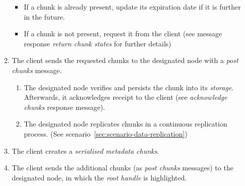 \begin{enumerate}
\begin{enumerate}
                \begin{itemize}
                    \item If a chunk is already present, update its expiration date if it is further in the future.
                    \item If a chunk is not present, request it from the client (see message response \emph{return chunk states} for further details)
                \end{itemize}
            \item The client sends the requested chunks to the designated node with a \emph{post chunks} message. %
                \begin{enumerate}
                    \item The designated node verifies and persists the chunk into its \emph{storage}. Afterwards, it acknowledges receipt to the client (see \emph{acknowledge chunks} response message).
                    \item The designated node replicates chunks in a continuous replication process. (See scenario~\ref{sec:scenario-data-replication})
                \end{enumerate}
            \item The client creates a \emph{serialised metadata chunks}. %
            \item The client sends the additional chunks (as \emph{post chunks} messages) to the designated node, in which the \emph{root handle} is highlighted. %
        \end{enumerate}
\end{enumerate}

